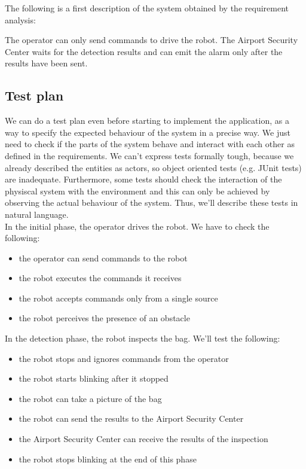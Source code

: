 \documentclass{llncs}
\begin{document}
The following is a first description of the system obtained by the requirement analysis:

The operator can only send commands to drive the robot.
The Airport Security Center waits for the detection results and can emit the alarm only after the results have been sent.
\newpage
\subsection{Test plan}
We can do a test plan even before starting to implement the application, as a way to specify the expected behaviour of the system in a precise way. We just need to check if the parts of the system behave and interact with each other as defined in the requirements.
We can't express tests formally tough, because we already described the entities as actors, so object oriented tests (e.g. JUnit tests) are inadequate. Furthermore, some tests should check the interaction of the physiscal system with the environment and this can only be achieved by observing the actual behaviour of the system. Thus, we'll describe these tests in natural language.\\
In the initial phase, the operator drives the robot. We have to check the following:
\begin{itemize}
\item the operator can send commands to the robot
\item the robot executes the commands it receives
\item the robot accepts commands only from a single source
\item the robot perceives the presence of an obstacle
\end{itemize}
In the detection phase, the robot inspects the bag. We'll test the following:
\begin{itemize}
\item the robot stops and ignores commands from the operator
\item the robot starts blinking after it stopped
\item the robot can take a picture of the bag
\item the robot can send the results to the Airport Security Center
\item the Airport Security Center can receive the results of the inspection
\item the robot stops blinking at the end of this phase
\end{itemize}
\end{document}
